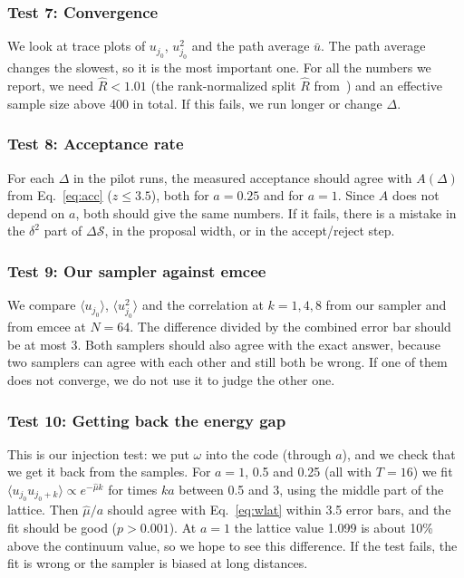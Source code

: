 \documentclass[11pt]{article}
\begin{document}
\subsubsection*{Test 7: Convergence}
We look at trace plots of $u_{j_0}$, $u_{j_0}^2$ and the path average $\bar u$. The path average changes the slowest, so it is the most important one. For all the numbers we report, we need $\hat R < 1.01$ (the rank-normalized split $\hat R$ from~\cite{vehtari}) and an effective sample size above 400 in total. If this fails, we run longer or change $\Delta$.

\subsubsection*{Test 8: Acceptance rate}
For each $\Delta$ in the pilot runs, the measured acceptance should agree with $A(\Delta)$ from Eq.~\eqref{eq:acc} ($z \le 3.5$), both for $a = 0.25$ and for $a = 1$. Since $A$ does not depend on $a$, both should give the same numbers. If it fails, there is a mistake in the $\delta^2$ part of $\Delta\mathcal S$, in the proposal width, or in the accept/reject step.

\subsubsection*{Test 9: Our sampler against emcee}
We compare $\langle u_{j_0}\rangle$, $\langle u_{j_0}^2\rangle$ and the correlation at $k = 1, 4, 8$ from our sampler and from emcee at $N = 64$. The difference divided by the combined error bar should be at most 3. Both samplers should also agree with the exact answer, because two samplers can agree with each other and still both be wrong. If one of them does not converge, we do not use it to judge the other one.

\subsubsection*{Test 10: Getting back the energy gap}
This is our injection test: we put $\omega$ into the code (through $a$), and we check that we get it back from the samples. For $a = 1$, 0.5 and 0.25 (all with $T = 16$) we fit $\langle u_{j_0}u_{j_0+k}\rangle \propto e^{-\hat\mu k}$ for times $ka$ between 0.5 and 3, using the middle part of the lattice. Then $\hat\mu/a$ should agree with Eq.~\eqref{eq:wlat} within 3.5 error bars, and the fit should be good ($p > 0.001$). At $a = 1$ the lattice value 1.099 is about 10\% above the continuum value, so we hope to see this difference. If the test fails, the fit is wrong or the sampler is biased at long distances.
\end{document}
